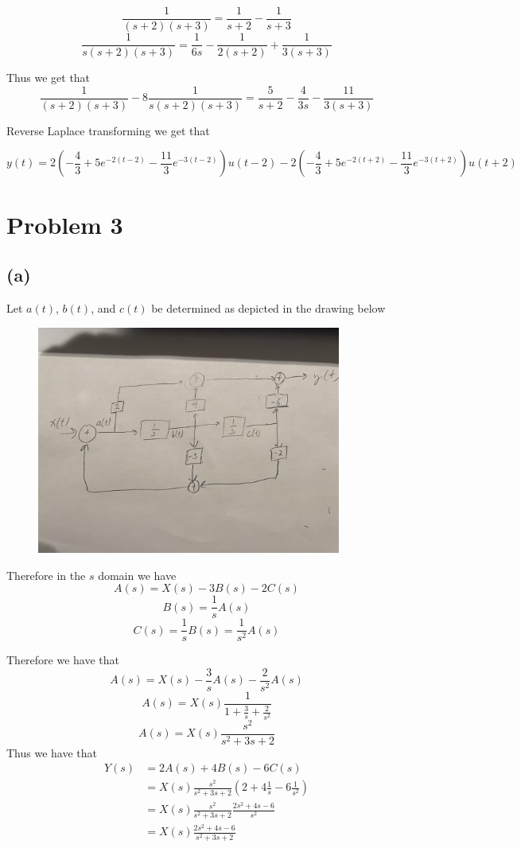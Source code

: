 \documentclass[12pt]{article}
\begin{document}
$$\frac{1}{(s+2)(s+3)}=\frac{1}{s+2}-\frac{1}{s+3}$$
$$\frac{1}{s(s+2)(s+3)}=\frac{1}{6s}-\frac{1}{2(s+2)}+\frac{1}{3(s+3)}$$

Thus we get that
$$\frac{1}{(s+2)(s+3)}-8\frac{1}{s(s+2)(s+3)}=\frac{5}{s+2}-\frac{4}{3s}-\frac{11}{3(s+3)}$$


Reverse Laplace transforming we get that

$$y(t)=\boxed{2\left(-\frac{4}{3}+5e^{-2(t-2)}-\frac{11}{3}e^{-3(t-2)}\right)u(t-2)-2\left(-\frac{4}{3}+5e^{-2(t+2)}-\frac{11}{3}e^{-3(t+2)}\right)u(t+2)}$$
\section*{Problem 3}
\subsection*{(a)}
Let $a(t)$, $b(t)$, and $c(t)$ be determined as depicted in the drawing below
\begin{center}
\begin{figure}[h]\includegraphics[width=10cm]{fig3}
\end{figure}
\end{center}

Therefore in the $s$ domain we have
$$A(s)=X(s)-3B(s)-2C(s)$$
$$B(s)=\frac{1}{s}A(s)$$
$$C(s)=\frac{1}{s}B(s)=\frac{1}{s^2}A(s)$$


Therefore we have that 
$$A(s)=X(s)-\frac{3}{s}A(s)-\frac{2}{s^2}A(s)$$
$$A(s)=X(s)\frac{1}{1+\frac{3}{s}+\frac{2}{s^2}}$$
$$A(s)=X(s)\frac{s^2}{s^2+3s+2}$$
Thus we have that 
\begin{align*}
Y(s)&=2A(s)+4B(s)-6C(s)\\
&=X(s)\frac{s^2}{s^2+3s+2}\left(2+4\frac{1}{s}-6\frac{1}{s^2}\right)\\
&=X(s)\frac{s^2}{s^2+3s+2}\frac{2s^2+4s-6}{s^2}\\
&=X(s)\frac{2s^2+4s-6}{s^2+3s+2}
\end{align*}
\end{document}
